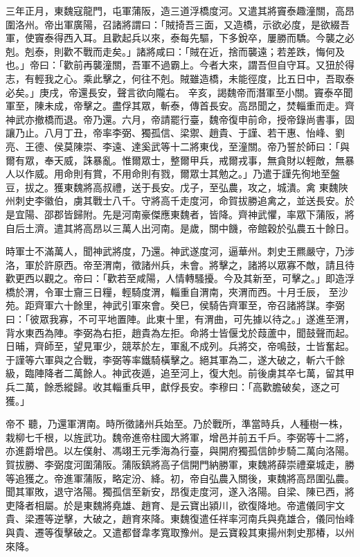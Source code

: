 \begin{pinyinscope}
 三年正月，東魏寇龍門，屯軍蒲阪，造三道浮橋度河。又遣其將竇泰趣潼關，高昂圍洛州。帝出軍廣陽，召諸將謂曰：「賊掎吾三面，又造橋，示欲必度，是欲綴吾軍，使竇泰得西入耳。且歡起兵以來，泰每先驅，下多銳卒，屢勝而驕。今襲之必剋。剋泰，則歡不戰而走矣。」諸將咸曰：「賊在近，捨而襲遠；若差跌，悔何及也。」帝曰：「歡前再襲潼關，吾軍不過霸上。今者大來，謂吾但自守耳。又狃於得志，有輕我之心。乘此擊之，何往不剋。賊雖造橋，未能徑度，比五日中，吾取泰必矣。」庚戌，帝還長安，聲言欲向隴右。
 辛亥，謁魏帝而潛軍至小關。竇泰卒聞軍至，陳未成，帝擊之。盡俘其眾，斬泰，傳首長安。高昂聞之，焚輜重而走。齊神武亦撤橋而退。帝乃還。六月，帝請罷行臺，魏帝復申前命，授帝錄尚書事，固讓乃止。八月丁丑，帝率李弼、獨孤信、梁禦、趙貴、于謹、若干惠、怡峰、劉亮、王德、侯莫陳崇、李遠、達奚武等十二將東伐，至潼關。帝乃誓於師曰：「與爾有眾，奉天威，誅暴亂。惟爾眾士，整爾甲兵，戒爾戎事，無貪財以輕敵，無暴人以作威。用命則有賞，不用命則有戮，爾眾士其勉之。」乃遣于謹先徇地至盤豆，拔之。獲東魏將高叔禮，送于長安。戊子，至弘農，攻之，城潰。禽
 東魏陜州刺史李徽伯，虜其戰士八千。守將高千走度河，命賀拔勝追禽之，並送長安。於是宜陽、邵郡皆歸附。先是河南豪傑應東魏者，皆降。齊神武懼，率眾下蒲阪，將自后土濟。遣其將高昂以三萬人出河南。是歲，關中饑，帝館穀於弘農五十餘日。



 時軍士不滿萬人，聞神武將度，乃還。神武遂度河，逼華州。刺史王羆嚴守，乃涉洛，軍於許原西。帝至渭南，徵諸州兵，未會。將擊之，諸將以眾寡不敵，請且待歡更西以觀之。帝曰：「歡若至咸陽，人情轉騷擾。今及其新至，可擊之。」即造浮橋於渭，令軍士齎三日糧，輕騎度渭，輜重自渭南，夾渭而西。十月壬辰，
 至沙苑。距齊軍六十餘里，神武引軍來會。癸巳，侯騎告齊軍至，帝召諸將謀。李弼曰：「彼眾我寡，不可平地置陣。此東十里，有渭曲，可先據以待之。」遂進至渭，背水東西為陣。李弼為右拒，趙貴為左拒。命將士皆偃戈於葭蘆中，聞鼓聲而起。日晡，齊師至，望見軍少，競萃於左，軍亂不成列。兵將交，帝鳴鼓，士皆奮起。于謹等六軍與之合戰，李弼等率鐵騎橫擊之。絕其軍為二，遂大破之，斬六千餘級，臨陣降者二萬餘人。神武夜遁，追至河上，復大剋。前後虜其卒七萬，留其甲兵二萬，餘悉縱歸。收其輜重兵甲，獻俘長安。李穆曰：「高歡膽破矣，逐之可獲。」



 帝不
 聽，乃還軍渭南。時所徵諸州兵始至。乃於戰所，準當時兵，人種樹一株，栽柳七千根，以旌武功。魏帝進帝柱國大將軍，增邑并前五千戶。李弼等十二將，亦進爵增邑。以左僕射、馮翊王元季海為行臺，與開府獨孤信帥步騎二萬向洛陽。賀拔勝、李弼度河圍蒲阪。蒲阪鎮將高子信開門納勝軍，東魏將薛崇禮棄城走，勝等追獲之。帝進軍蒲阪，略定汾、絳。初，帝自弘農入關後，東魏將高昂圍弘農。聞其軍敗，退守洛陽。獨孤信至新安，昂復走度河，遂入洛陽。自梁、陳已西，將吏降者相屬。於是東魏將堯雄、趙育、是云寶出潁川，欲復降地。帝遣儀同宇文
 貴、梁遷等逆擊，大破之，趙育來降。東魏復遣任祥率河南兵與堯雄合，儀同怡峰與貴、遷等復擊破之。又遣都督韋孝寬取豫州。是云寶殺其東揚州刺史那椿，以州來降。




\end{pinyinscope}
